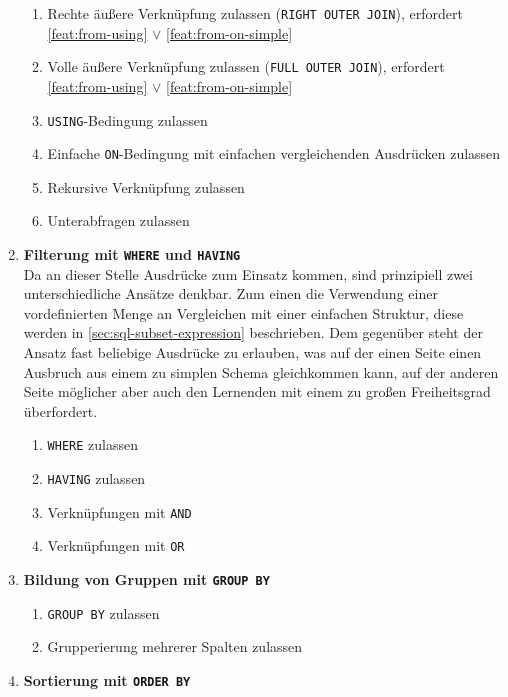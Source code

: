\begin{enumerate}
\begin{enumerate}
  \item \label{feat:from-right-join} Rechte äußere Verknüpfung zulassen (\texttt{RIGHT OUTER JOIN}), erfordert \ref{feat:from-using} $\lor$ \ref{feat:from-on-simple}
  \item \label{feat:from-full-join} Volle äußere Verknüpfung zulassen (\texttt{FULL OUTER JOIN}), erfordert \ref{feat:from-using} $\lor$ \ref{feat:from-on-simple}
  \item \label{feat:from-using} \texttt{USING}-Bedingung zulassen
  \item \label{feat:from-on-simple} Einfache \texttt{ON}-Bedingung mit einfachen vergleichenden Ausdrücken zulassen
  \item \label{feat:from-recursive} Rekursive Verknüpfung zulassen 
  \item \label{feat:from-sub} Unterabfragen zulassen
  \end{enumerate}
\item \textbf{Filterung mit \texttt{WHERE} und \texttt{HAVING}} \\
  Da an dieser Stelle Ausdrücke zum Einsatz kommen, sind prinzipiell zwei unterschiedliche Ansätze denkbar. Zum einen die Verwendung einer vordefinierten Menge an Vergleichen mit einer einfachen Struktur, diese werden in \ref{sec:sql-subset-expression} beschrieben. Dem gegenüber steht der Ansatz fast beliebige Ausdrücke zu erlauben, was auf der einen Seite einen Ausbruch aus einem zu simplen Schema gleichkommen kann, auf der anderen Seite möglicher aber auch den Lernenden mit einem zu großen Freiheitsgrad überfordert.
  \begin{enumerate}
  \item \label{feat:where-allow} \texttt{WHERE} zulassen
  \item \label{feat:having-allow} \texttt{HAVING} zulassen
  \item \label{feat:where-and} Verknüpfungen mit \texttt{AND}
  \item \label{feat:where-or} Verknüpfungen mit \texttt{OR}
  \end{enumerate}
\item \textbf{Bildung von Gruppen mit \texttt{GROUP BY}}
  \begin{enumerate}
  \item \label{feat:group-allow} \texttt{GROUP BY} zulassen
  \item \label{feat:group-multiple} Grupperierung mehrerer Spalten zulassen
  \end{enumerate}
\item \textbf{Sortierung mit \texttt{ORDER BY}} \\

\end{enumerate}
